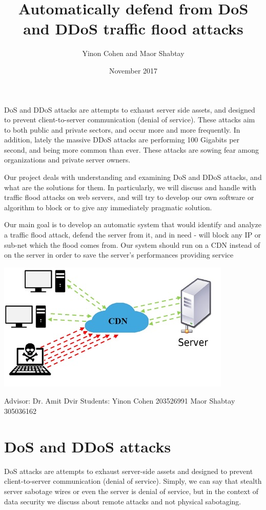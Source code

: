 \documentclass{article}
\title{Automatically defend from DoS and DDoS traffic flood attacks}
\author{Yinon Cohen and Maor Shabtay }
\date{November 2017}
\begin{document}
\maketitle

\hfill \break DoS and DDoS attacks are attempts to exhaust server side assets, and designed to prevent client-to-server communication (denial of service). These attacks aim to both public and private sectors, and occur more and more frequently. In addition, lately the massive DDoS attacks are performing 100 Gigabits per second, and being more common than ever. These attacks are sowing fear among organizations and private server owners.

\hfill \break Our project deals with understanding and examining DoS and DDoS attacks, and what are the solutions for them. In particularly, we will discuss and handle with traffic flood attacks on web servers, and will try to develop our own software or algorithm to block or to give any immediately pragmatic solution.

\hfill \break Our main goal is to develop an automatic system that would identify and analyze a traffic flood attack, defend the server from it, and in need - will block any IP or sub-net which the flood comes from. Our system should run on a CDN instead of on the server in order to save the server’s performances providing service
\hfill \break \hfill \break
    \begin{center}
        \includegraphics{pi}
    \end{center}
 \hfill \break Advisor: Dr. Amit Dvir
 \hfill \break Students: 
 \hfill \break Yinon Cohen 203526991
 \hfill \break Maor Shabtay 305036162

\newpage

\section*{DoS and DDoS attacks}
\hfill \break DoS attacks are attempts to exhaust server-side assets and designed to prevent client-to-server communication (denial of service). Simply, we can say that stealth server sabotage wires or even the server is denial of service, but in the context of data security we discuss about remote attacks and not physical sabotaging.
\end{document}
